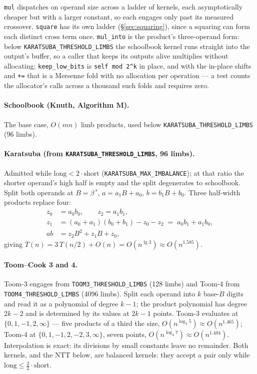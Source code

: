 \documentclass[11pt]{article}
\newcommand{\code}[1]{\texttt{#1}}
\begin{document}
\code{mul} dispatches on operand size across a ladder of kernels, each
asymptotically cheaper but with a larger constant, so each engages only past
its measured crossover. \code{square} has its own ladder
(\S\ref{sec:squaring}), since a squaring can form each distinct cross term
once. \code{mul\_into} is the product's three-operand form: below
\code{KARATSUBA\_THRESHOLD\_LIMBS} the schoolbook kernel runs straight into
the output's buffer, so a caller that keeps its outputs alive multiplies
without allocating; \code{keep\_low\_bits} is \code{self mod 2\^{}k} in place,
and with the in-place shifts and \code{+=} that is a Mersenne fold with no
allocation per operation --- a test counts the allocator's calls across a
thousand such folds and requires zero.

\paragraph{Schoolbook (Knuth, Algorithm M).}
The base case, $O(mn)$ limb products, used below
\code{KARATSUBA\_THRESHOLD\_LIMBS} (96 limbs).

\paragraph{Karatsuba (from \code{KARATSUBA\_THRESHOLD\_LIMBS}, 96 limbs).}
Admitted while $\text{long} < 2 \cdot \text{short}$
(\code{KARATSUBA\_MAX\_IMBALANCE}); at that ratio the shorter operand's high
half is empty and the split degenerates to schoolbook.
Split both operands at $B = \beta^{\,s}$, $a = a_1 B + a_0$,
$b = b_1 B + b_0$. Three half-width products replace four:
\begin{equation}
\begin{aligned}
z_0 &= a_0 b_0, \qquad z_2 = a_1 b_1,\\
z_1 &= (a_0 + a_1)(b_0 + b_1) - z_0 - z_2 \;=\; a_0 b_1 + a_1 b_0,\\
ab  &= z_2 B^2 + z_1 B + z_0,
\end{aligned}
\end{equation}
giving $T(n) = 3\,T(n/2) + O(n) = O(n^{\lg 3}) \approx O(n^{1.585})$.

\paragraph{Toom--Cook 3 and 4.}
Toom-3 engages from \code{TOOM3\_THRESHOLD\_LIMBS} (128 limbs) and Toom-4
from \code{TOOM4\_THRESHOLD\_LIMBS} (4096 limbs).
Split each operand into $k$ base-$B$ digits and read it as a polynomial of
degree $k-1$; the product polynomial has degree $2k-2$ and is determined by
its values at $2k-1$ points. Toom-3 evaluates at
$\{0, 1, -1, 2, \infty\}$ --- five products of a third the size,
$O(n^{\log_3 5}) \approx O(n^{1.465})$; Toom-4 at
$\{0, 1, -1, 2, -2, 3, \infty\}$, seven points,
$O(n^{\log_4 7}) \approx O(n^{1.404})$. Interpolation is exact: its
divisions by small constants leave no remainder. Both kernels, and the NTT
below, are balanced kernels: they accept a pair only while
$\text{long} \le \tfrac32 \cdot \text{short}$.
\end{document}
